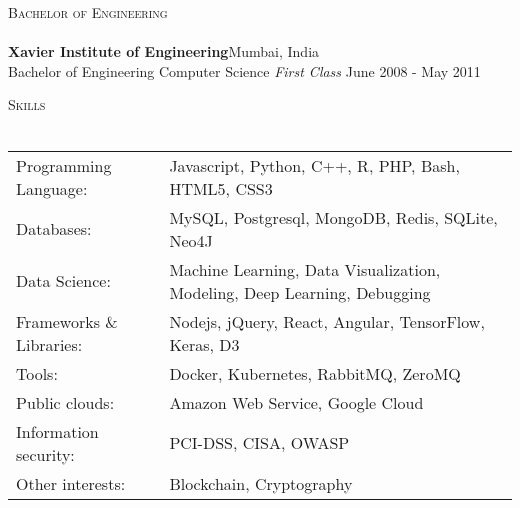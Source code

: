 \documentclass[a4paper]{article}
\newcommand{\lineunder} {
    \vspace*{-8pt} \\
    \hspace*{-18pt} \hrulefill \\
}
\newcommand{\header} [1] {
    {\hspace*{-18pt}\vspace*{6pt} \textsc{#1}}
    \vspace*{-6pt} \lineunder
}
\begin{document}
\header{Bachelor of Engineering}
\textbf{Xavier Institute of Engineering}\hfill Mumbai, India\\
Bachelor of Engineering Computer Science \textit{First Class} \hfill June 2008 - May 2011\\
\vspace{2mm}

\header{Skills}
\begin{tabular}{ l l }
	Programming Language:    & Javascript, Python, C++, R, PHP, Bash, HTML5, CSS3                       \\
	Databases:               & MySQL, Postgresql, MongoDB, Redis, SQLite, Neo4J                         \\
	Data Science:            & Machine Learning, Data Visualization, Modeling, Deep Learning, Debugging \\
	Frameworks \& Libraries: & Nodejs, jQuery, React, Angular, TensorFlow, Keras, D3                    \\
	Tools:                   & Docker, Kubernetes, RabbitMQ, ZeroMQ                                     \\
	Public clouds:           & Amazon Web Service, Google Cloud                                         \\
	Information security:    & PCI-DSS, CISA, OWASP                                                     \\
	Other interests:         & Blockchain, Cryptography                                                 \\
\end{tabular}
\vspace{2mm}



\ 
\end{document}
